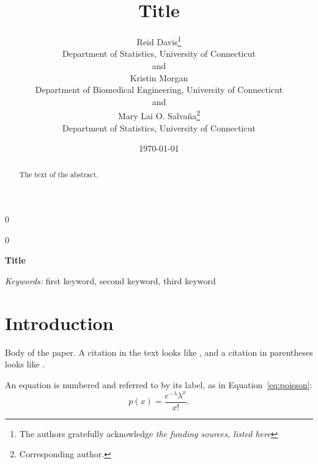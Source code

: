 \documentclass[12pt]{article}
\newcommand{\blind}{0}
\begin{document}
\def\spacingset#1{\renewcommand{\baselinestretch}%
{#1}\small\normalsize} \spacingset{1}


\date{\today}

\blind
{
  \title{\bf Title}
  \author{
    Reid Davis\thanks{
    The authors gratefully acknowledge \textit{the funding sources, listed here}}\\
    Department of Statistics, University of Connecticut\\
    and\\
    Kristin Morgan\\
    Department of Biomedical Engineering, University of Connecticut\\
    and\\
    Mary Lai O. Salva\~na\thanks{Corresponding author.}\\
    Department of Statistics, University of Connecticut}
  \maketitle
} \fi

\blind
{
  \spacingset{.8}
  \bigskip
  \bigskip
  \bigskip
  \begin{center}
    {\LARGE\bf Title}
  \end{center}
  \smallskip
  \bigskip
  \spacingset{1}
} \fi

\bigskip
\bigskip
\begin{abstract}
The text of the abstract.
\end{abstract}

\noindent%
{\it Keywords:} first keyword, second keyword, third keyword
\vfill

\newpage
\spacingset{1.9} %

\section{Introduction}
\label{sec:intro}

Body of the paper. A citation in the text looks like \citet{Campbell02}, and a
citation in parentheses looks like \citep{Schubert13, Chi81}.

An equation is numbered and referred to by its label, as in
Equation~\eqref{eq:poisson}:
\begin{equation}
p(x) = \frac{e^{-\lambda} \lambda^{x}}{x!}.
\label{eq:poisson}
\end{equation}
\end{document}
